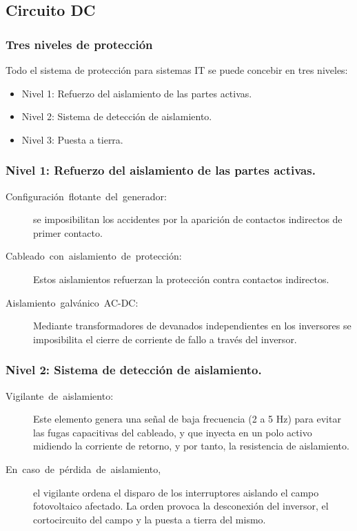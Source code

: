 \documentclass[serif, xcolor=dvipsnames]{beamer}
\begin{document}
\subsection{Circuito DC}


\begin{frame}
\frametitle{Tres niveles de protección}

Todo el sistema de protección para sistemas IT se puede concebir en
tres niveles: 
\begin{itemize}
\item Nivel 1: Refuerzo del aislamiento de las partes activas. 
\item Nivel 2: Sistema de detección de aislamiento.
\item Nivel 3: Puesta a tierra.
\end{itemize}

\end{frame}

\begin{frame}
\frametitle{Nivel 1: Refuerzo del aislamiento de las partes activas. }
\begin{description}
\item [{Configuración~flotante~del~generador:}] se imposibilitan los
accidentes por la aparición de contactos indirectos de primer contacto. 
\item [{Cableado~con~aislamiento~de~protección:}] Estos aislamientos
refuerzan la protección contra contactos indirectos. 
\item [{Aislamiento~galvánico~AC-DC:}] Mediante transformadores de devanados
independientes en los inversores se imposibilita el cierre de corriente
de fallo a través del inversor.
\end{description}

\end{frame}

\begin{frame}
\frametitle{Nivel 2: Sistema de detección de aislamiento. }
\begin{description}
\item [{Vigilante~de~aislamiento:}] Este elemento genera una señal de
baja frecuencia (2 a 5 Hz) para evitar las fugas capacitivas del cableado,
y que inyecta en un polo activo midiendo la corriente de retorno,
y por tanto, la resistencia de aislamiento.
\item [{En~caso~de~pérdida~de~aislamiento,}] el vigilante ordena el
disparo de los interruptores aislando el campo fotovoltaico afectado.
La orden provoca la desconexión del inversor, el cortocircuito del
campo y la puesta a tierra del mismo. 
\end{description}

\end{frame}
\end{document}
